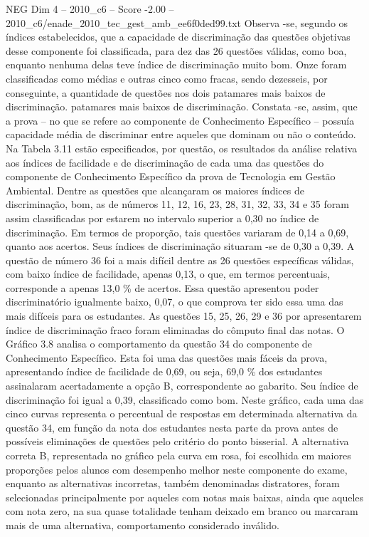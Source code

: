 \begin{textsample}{NEG Dim 4 – 2010\_c6 – Score -2.00 – 2010\_c6/enade\_2010\_tec\_gest\_amb\_ee6f0ded99.txt}
Observa -se, segundo os índices estabelecidos, que a capacidade de discriminação das questões objetivas desse componente foi classificada, para dez das 26 questões válidas, como boa, enquanto nenhuma delas teve índice de discriminação muito bom.
Onze foram classificadas como médias e outras cinco como fracas, sendo dezesseis, por conseguinte, a quantidade de questões nos dois patamares mais baixos de discriminação. patamares mais baixos de discriminação.
Constata -se, assim, que a prova – no que se refere ao componente de Conhecimento Específico – possuía capacidade média de discriminar entre aqueles que dominam ou não o conteúdo.
Na Tabela 3.11 estão especificados, por questão, os resultados da análise relativa aos índices de facilidade e de discriminação de cada uma das questões do componente de Conhecimento Específico da prova de Tecnologia em Gestão Ambiental.
Dentre as questões que alcançaram os maiores índices de discriminação, bom, as de números 11, 12, 16, 23, 28, 31, 32, 33, 34 e 35 foram assim classificadas por estarem no intervalo superior a 0,30 no índice de discriminação.
Em termos de proporção, tais questões variaram de 0,14 a 0,69, quanto aos acertos.
Seus índices de discriminação situaram -se de 0,30 a 0,39.
A questão de número 36 foi a mais difícil dentre as 26 questões específicas válidas, com baixo índice de facilidade, apenas 0,13, o que, em termos percentuais, corresponde a apenas 13,0 \% de acertos.
Essa questão apresentou poder discriminatório igualmente baixo, 0,07, o que comprova ter sido essa uma das mais difíceis para os estudantes.
As questões 15, 25, 26, 29 e 36 por apresentarem índice de discriminação fraco foram eliminadas do cômputo final das notas.
O Gráfico 3.8 analisa o comportamento da questão 34 do componente de Conhecimento Específico.
Esta foi uma das questões mais fáceis da prova, apresentando índice de facilidade de 0,69, ou seja, 69,0 \% dos estudantes assinalaram acertadamente a opção B, correspondente ao gabarito.
Seu índice de discriminação foi igual a 0,39, classificado como bom.
Neste gráfico, cada uma das cinco curvas representa o percentual de respostas em determinada alternativa da questão 34, em função da nota dos estudantes nesta parte da prova antes de possíveis eliminações de questões pelo critério do ponto bisserial.
A alternativa correta B, representada no gráfico pela curva em rosa, foi escolhida em maiores proporções pelos alunos com desempenho melhor neste componente do exame, enquanto as alternativas incorretas, também denominadas distratores, foram selecionadas principalmente por aqueles com notas mais baixas, ainda que aqueles com nota zero, na sua quase totalidade tenham deixado em branco ou marcaram mais de uma alternativa, comportamento considerado inválido.

\end{textsample}
